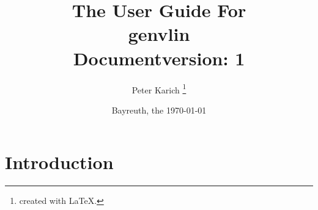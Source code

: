 \documentclass[12pt]{article}
\begin{document}
\addtocounter{footnote}{2}
\pagestyle{empty}
\title{ \bf \LARGE The User Guide For \\[1cm] genvlin\\[1cm] Documentversion: 1}
\author{Peter Karich \footnote{created with \LaTeX{}.}}
\date{Bayreuth, the \today}
\maketitle
\newpage
\setcounter{tocdepth}{2}
\tableofcontents
\newpage
\pagestyle{headings}


\section{Introduction}
\end{document}
